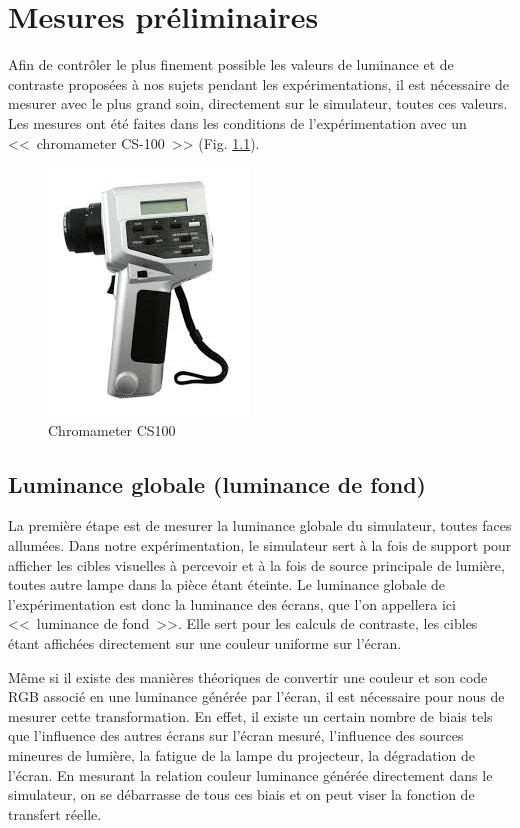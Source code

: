 \chapter{Mesures préliminaires}
\par Afin de contrôler le plus finement possible les valeurs de luminance et de contraste proposées à nos sujets pendant les expérimentations, il est nécessaire de mesurer avec le plus grand soin, directement sur le simulateur, toutes ces valeurs. Les mesures ont été faites dans les conditions de l'expérimentation avec un <<~chromameter CS-100~>> (Fig. \ref{fig:chromameter_cs100}).

\begin{figure}
	\centering
	\includegraphics[scale=1]{Figures/ChromameterCS100}
	\caption{Chromameter CS100}
	\label{fig:chromameter_cs100}
\end{figure}
	
	\section{Luminance globale (luminance de fond)}
	\par La première étape est de mesurer la luminance globale du simulateur, toutes faces allumées. Dans notre expérimentation, le simulateur sert à la fois de support pour afficher les cibles visuelles à percevoir et à la fois de source principale de lumière, toutes autre lampe dans la pièce étant éteinte. Le luminance globale de l'expérimentation est donc la luminance des écrans, que l'on appellera ici <<~luminance de fond~>>. Elle sert pour les calculs de contraste, les cibles étant affichées directement sur une couleur uniforme sur l'écran.
	
	\par Même si il existe des manières théoriques de convertir une couleur et son code RGB associé en une luminance générée par l'écran, il est nécessaire pour nous de mesurer cette transformation. En effet, il existe un certain nombre de biais tels que l'influence des autres écrans sur l'écran mesuré, l'influence des sources mineures de lumière, la fatigue de la lampe du projecteur, la dégradation de l'écran. En mesurant la relation couleur luminance générée directement dans le simulateur, on se débarrasse de tous ces biais et on peut viser la fonction de transfert réelle.
	
